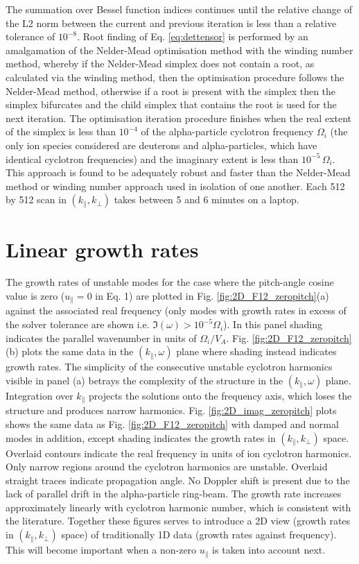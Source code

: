\documentclass[12pt]{iopart}
\begin{document}
The summation over Bessel function indices continues until the relative change of the L2 norm between the current and previous iteration is less than a relative tolerance of $10^{-8}$. Root finding of Eq. \ref{eq:dettensor} is performed by an amalgamation of the Nelder-Mead\cite{Nelder1965} optimisation method with the winding number method, whereby if the Nelder-Mead simplex does not contain a root, as calculated via the winding method, then the optimisation procedure follows the Nelder-Mead method, otherwise if a root is present with the simplex then the simplex bifurcates and the child simplex that contains the root is used for the next iteration. The optimisation iteration procedure finishes when the real extent of the simplex is less than $10^{-4}$ of the alpha-particle cyclotron frequency $\Omega_i$ (the only ion species considered are deuterons and alpha-particles, which have identical cyclotron frequencies) and the imaginary extent is less than $10^{-5}\,\Omega_i$. This approach is found to be adequately robust and faster than the Nelder-Mead method or winding number approach used in isolation of one another. Each 512 by 512 scan in $(k_\parallel, k_\perp)$ takes between 5 and 6 minutes on a laptop.

\section{Linear growth rates}

The growth rates of unstable modes for the case where the pitch-angle cosine
value is zero ($u_\parallel = 0$ in Eq. 1) are plotted in Fig.
\ref{fig:2D_F12_zeropitch}(a) against the associated real frequency (only modes
with growth rates in excess of the solver tolerance are shown i.e. $\Im(\omega)
> 10^{-5} \Omega_i$). In this panel shading indicates the parallel wavenumber in
units of $\Omega_i/V_A$. Fig. \ref{fig:2D_F12_zeropitch}(b) plots the same data in the $(k_\parallel,\omega)$ plane where shading instead indicates growth rates. The simplicity of the consecutive unstable cyclotron harmonics visible in panel (a) betrays the complexity of the structure in the $(k_\parallel, \omega)$ plane. Integration over $k_\parallel$ projects the solutions onto the frequency axis, which loses the structure and produces narrow harmonics. Fig. \ref{fig:2D_imag_zeropitch} plots shows the same data as Fig. \ref{fig:2D_F12_zeropitch} with damped and normal modes in addition, except shading indicates the growth rates in $(k_\parallel, k_\perp)$ space. Overlaid contours indicate the real frequency in units of ion cyclotron harmonics. Only narrow regions around the cyclotron harmonics are unstable. Overlaid straight traces indicate propagation angle. No Doppler shift is present due to the lack of parallel drift in the alpha-particle ring-beam. The growth rate increases approximately linearly with cyclotron harmonic number, which is consistent with the literature\cite{Dendy1994}. Together these figures serves to introduce a 2D view (growth rates in $(k_\parallel, k_\perp)$ space) of traditionally 1D data (growth rates against frequency). This will become important when a non-zero $u_\parallel$ is taken into account next.
\end{document}
